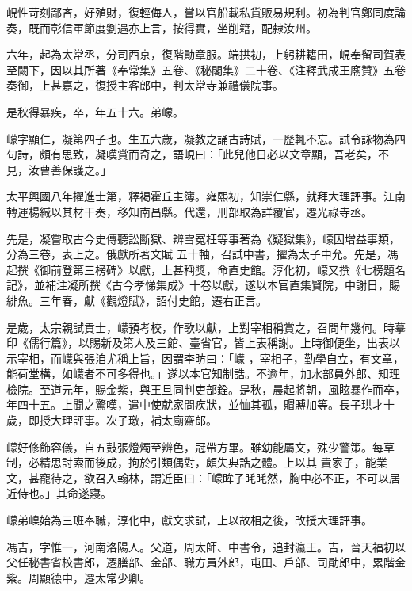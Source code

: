\begin{pinyinscope}
 峴性苛刻鄙吝，好殖財，復輕侮人，嘗以官船載私貨販易規利。初為判官鄭同度論奏，既而彰信軍節度劉遇亦上言，按得實，坐削籍，配隸汝州。



 六年，起為太常丞，分司西京，復階勛章服。端拱初，上躬耕籍田，峴奉留司賀表至闕下，因以其所著《奉常集》五卷、《秘閣集》二十卷、《注釋武成王廟贊》五卷奏御，上甚嘉之，復授主客郎中，判太常寺兼禮儀院事。



 是秋得暴疾，卒，年五十六。弟㠓。



 㠓字顯仁，凝第四子也。生五六歲，凝教之誦古詩賦，一歷輒不忘。試令詠物為四句詩，頗有思致，凝嘆賞而奇之，語峴曰：「此兒他日必以文章顯，吾老矣，不見，汝曹善保護之。」



 太平興國八年擢進士第，釋褐霍丘主簿。雍熙初，知崇仁縣，就拜大理評事。江南轉運楊緘以其材干奏，移知南昌縣。代還，刑部取為詳覆官，遷光祿寺丞。



 先是，凝嘗取古今史傳聽訟斷獄、辨雪冤枉等事著為《疑獄集》，㠓因增益事類，分為三卷，表上之。俄獻所著文賦
 五十軸，召試中書，擢為太子中允。先是，馮起撰《御前登第三榜碑》以獻，上甚稱獎，命直史館。淳化初，㠓又撰《七榜題名記》，並補注凝所撰《古今孝悌集成》十卷以獻，遂以本官直集賢院，中謝日，賜緋魚。三年春，獻《觀燈賦》，詔付史館，遷右正言。



 是歲，太宗親試貢士，㠓預考校，作歌以獻，上對宰相稱賞之，召問年幾何。時摹印《儒行篇》，以賜新及第人及三館、臺省官，皆上表稱謝。上時御便坐，出表以示宰相，而㠓與張洎尤稱上旨，因謂李昉曰：「㠓
 ，宰相子，勤學自立，有文章，能荷堂構，如㠓者不可多得也。」遂以本官知制誥。不逾年，加水部員外郎、知理檢院。至道元年，賜金紫，與王旦同判吏部銓。是秋，晨起將朝，風眩暴作而卒，年四十五。上聞之驚嘆，遣中使就家問疾狀，並恤其孤，賵賻加等。長子珙才十歲，即授大理評事。次子璬，補太廟齋郎。



 㠓好修飾容儀，自五鼓張燈燭至辨色，冠帶方畢。雖幼能屬文，殊少警策。每草制，必精思討索而後成，拘於引類偶對，頗失典誥之體。上以其
 貴家子，能業文，甚寵待之，欲召入翰林，謂近臣曰：「㠓眸子眊眊然，胸中必不正，不可以居近侍也。」其命遂寢。



 㠓弟嵲始為三班奉職，淳化中，獻文求試，上以故相之後，改授大理評事。



 馮吉，字惟一，河南洛陽人。父道，周太師、中書令，追封瀛王。吉，晉天福初以父任秘書省校書郎，遷膳部、金部、職方員外郎，屯田、戶部、司勛郎中，累階金紫。周顯德中，遷太常少卿。




\end{pinyinscope}
